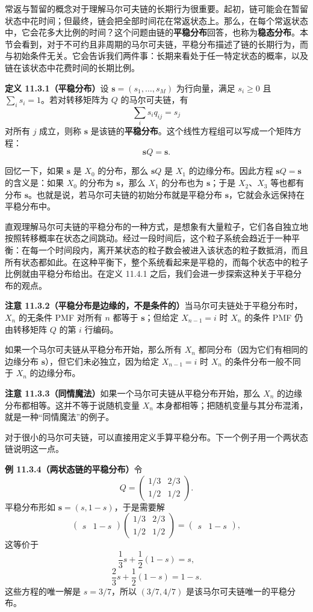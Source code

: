 \documentclass[UTF8,12pt,a4paper,fontset=fandol]{ctexart}
\begin{document}
常返与暂留的概念对于理解马尔可夫链的长期行为很重要。起初，链可能会在暂留状态中花时间；但最终，链会把全部时间花在常返状态上。那么，在每个常返状态中，它会花多大比例的时间？这个问题由链的\textbf{平稳分布}回答，也称为\textbf{稳态分布}。本节会看到，对于不可约且非周期的马尔可夫链，平稳分布描述了链的长期行为，而与初始条件无关。它会告诉我们两件事：长期来看处于任一特定状态的概率，以及链在该状态中花费时间的长期比例。

\noindent\textbf{定义 11.3.1（平稳分布）}\quad 设 $\mathbf s=(s_1,\ldots,s_M)$ 为行向量，满足 $s_i\ge0$ 且 $\sum_i s_i=1$。若对转移矩阵为 $Q$ 的马尔可夫链，有
\[
  \sum_i s_i q_{ij}=s_j
\]
对所有 $j$ 成立，则称 $\mathbf s$ 是该链的\textbf{平稳分布}。这个线性方程组可以写成一个矩阵方程：
\[
  \mathbf sQ=\mathbf s.
\]

回忆一下，如果 $\mathbf s$ 是 $X_0$ 的分布，那么 $\mathbf sQ$ 是 $X_1$ 的边缘分布。因此方程 $\mathbf sQ=\mathbf s$ 的含义是：如果 $X_0$ 的分布为 $\mathbf s$，那么 $X_1$ 的分布也为 $\mathbf s$；于是 $X_2$、$X_3$ 等也都有分布 $\mathbf s$。也就是说，若马尔可夫链的初始分布就是平稳分布 $\mathbf s$，它就会永远保持在平稳分布中。

直观理解马尔可夫链的平稳分布的一种方式，是想象有大量粒子，它们各自独立地按照转移概率在状态之间跳动。经过一段时间后，这个粒子系统会趋近于一种平衡：在每一个时间段内，离开某状态的粒子数会被进入该状态的粒子数抵消，而且所有状态都如此。在这种平衡下，整个系统看起来是平稳的，而每个状态中的粒子比例就由平稳分布给出。在定义 11.4.1 之后，我们会进一步探索这种关于平稳分布的观点。

\noindent\textbf{注意 11.3.2（平稳分布是边缘的，不是条件的）}\quad 当马尔可夫链处于平稳分布时，$X_n$ 的无条件 PMF 对所有 $n$ 都等于 $\mathbf s$；但给定 $X_{n-1}=i$ 时 $X_n$ 的条件 PMF 仍由转移矩阵 $Q$ 的第 $i$ 行编码。

如果一个马尔可夫链从平稳分布开始，那么所有 $X_n$ 都同分布（因为它们有相同的边缘分布 $\mathbf s$），但它们未必独立，因为给定 $X_{n-1}=i$ 时 $X_n$ 的条件分布一般不同于 $X_n$ 的边缘分布。

\noindent\textbf{注意 11.3.3（同情魔法）}\quad 如果一个马尔可夫链从平稳分布开始，那么 $X_n$ 的边缘分布都相等。这并不等于说随机变量 $X_n$ 本身都相等；把随机变量与其分布混淆，就是一种“同情魔法”的例子。

对于很小的马尔可夫链，可以直接用定义手算平稳分布。下一个例子用一个两状态链说明这一点。

\noindent\textbf{例 11.3.4（两状态链的平稳分布）}\quad 令
\[
  Q=
  \begin{pmatrix}
    1/3 & 2/3\\
    1/2 & 1/2
  \end{pmatrix}.
\]
平稳分布形如 $\mathbf s=(s,1-s)$，于是需要解
\[
  \begin{pmatrix}s&1-s\end{pmatrix}
  \begin{pmatrix}
    1/3 & 2/3\\
    1/2 & 1/2
  \end{pmatrix}
  =
  \begin{pmatrix}s&1-s\end{pmatrix},
\]
这等价于
\[
  \frac13s+\frac12(1-s)=s,
\]
\[
  \frac23s+\frac12(1-s)=1-s.
\]
这些方程的唯一解是 $s=3/7$，所以 $(3/7,4/7)$ 是该马尔可夫链唯一的平稳分布。
\end{document}
